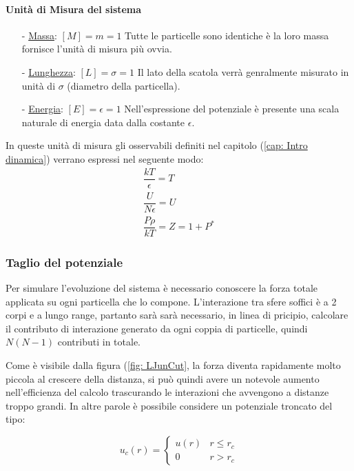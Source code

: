 \paragraph{Unità di Misura del sistema}
\begin{itemize}
\item[-] \underline{Massa}: $[M]=m=1$ 
\newline Tutte le particelle sono identiche è la loro massa fornisce l'unità di misura più ovvia.

\item[-] \underline{Lunghezza}: $[L]=\sigma=1$ 
\newline Il lato della scatola verrà genralmente misurato in unità di $\sigma$ (diametro della particella).

\item[-] \underline{Energia}: $[E]=\epsilon=1$ 
\newline Nell'espressione del potenziale è presente una scala naturale di energia data dalla costante $\epsilon$.
\end{itemize}
In queste unità di misura gli osservabili definiti nel capitolo (\ref{cap: Intro dinamica}) verrano espressi nel seguente modo:
\begin{eqnarray}
	\dfrac{kT}{\epsilon}  = T \\
	\dfrac{U}{N \epsilon} = U \\
	\dfrac{P \rho}{kT}	  = Z = 1 + P^{*}
\end{eqnarray}

\FloatBarrier 
\subsubsection{Taglio del potenziale}
Per simulare l'evoluzione del sistema è necessario conoscere la forza totale applicata su ogni particella che lo compone.
L'interazione tra sfere soffici è a 2 corpi e a lungo range, partanto sarà sarà necessario, in linea di pricipio, calcolare il contributo di interazione generato da ogni coppia di particelle, quindi $N(N-1)$ contributi in totale.

Come è visibile dalla figura (\ref{fig: LJunCut}, la forza diventa rapidamente molto piccola al crescere della distanza, si può quindi avere un notevole aumento nell'efficienza del calcolo trascurando le interazioni che avvengono a distanze troppo grandi.\newline
In altre parole è possibile considere un potenziale troncato del tipo:

\begin{displaymath}
	u_c(r) = 
	\begin{cases}u(r) & r \leq r_c\\
	0 & r > r_c \end{cases}
\end{displaymath}

